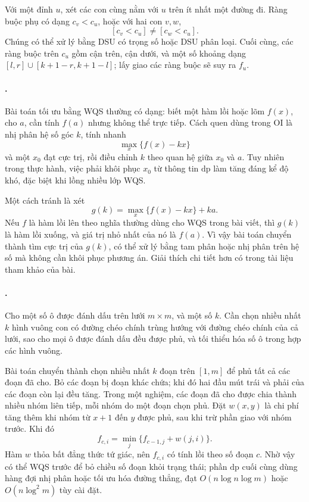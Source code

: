 \documentclass[11pt]{article}
\begin{document}
Với một đỉnh \(u\), xét các con cùng nằm với \(u\) trên ít nhất một đường đi.
Ràng buộc phụ có dạng \(c_v<c_u\), hoặc với hai con \(v,w\),
\[
  [c_v<c_u]\ne[c_w<c_u].
\]
Chúng có thể xử lý bằng DSU có trọng số hoặc DSU phân loại. Cuối cùng, các
ràng buộc trên \(c_u\) gồm cận trên, cận dưới, và một số khoảng dạng
\([l,r]\cup[k+1-r,k+1-l]\); lấy giao các ràng buộc sẽ suy ra \(f_u\).

\paragraph{.}

Bài toán tối ưu bằng WQS thường có dạng: biết một hàm lồi hoặc lõm
\(f(x)\), cho \(a\), cần tính \(f(a)\) nhưng không thể trực tiếp. Cách quen
dùng trong OI là nhị phân hệ số góc \(k\), tính nhanh
\[
  \max_x\{f(x)-kx\}
\]
và một \(x_0\) đạt cực trị, rồi điều chỉnh \(k\) theo quan hệ giữa \(x_0\) và
\(a\). Tuy nhiên trong thực hành, việc phải khôi phục \(x_0\) từ thông tin
\(\mathrm{dp}\) làm tăng đáng kể độ khó, đặc biệt khi lồng nhiều lớp WQS.

Một cách tránh là xét
\[
  g(k)=\max_x\{f(x)-kx\}+ka.
\]
Nếu \(f\) là hàm lồi lên theo nghĩa thường dùng cho WQS trong bài viết, thì
\(g(k)\) là hàm lồi xuống, và giá trị nhỏ nhất của nó là \(f(a)\). Vì vậy bài
toán chuyển thành tìm cực trị của \(g(k)\), có thể xử lý bằng tam phân hoặc
nhị phân trên hệ số mà không cần khôi phục phương án. Giải thích chi tiết hơn
có trong tài liệu tham khảo của bài.

\paragraph{.}
Cho một số ô được đánh dấu trên lưới \(m\times m\), và một số \(k\). Cần chọn
nhiều nhất \(k\) hình vuông con có đường chéo chính trùng hướng với đường chéo
chính của cả lưới, sao cho mọi ô được đánh dấu đều được phủ, và tối thiểu hóa
số ô trong hợp các hình vuông.

Bài toán chuyển thành chọn nhiều nhất \(k\) đoạn trên \([1,m]\) để phủ tất cả
các đoạn đã cho. Bỏ các đoạn bị đoạn khác chứa; khi đó hai đầu mút trái và phải
của các đoạn còn lại đều tăng. Trong một nghiệm, các đoạn đã cho được chia
thành nhiều nhóm liên tiếp, mỗi nhóm do một đoạn chọn phủ. Đặt \(w(x,y)\) là
chi phí tăng thêm khi nhóm từ \(x+1\) đến \(y\) được phủ, sau khi trừ phần giao
với nhóm trước. Khi đó
\[
  f_{c,i}=\min_j\{f_{c-1,j}+w(j,i)\}.
\]
Hàm \(w\) thỏa bất đẳng thức tứ giác, nên \(f_{c,i}\) có tính lồi theo số
đoạn \(c\). Nhờ vậy có thể WQS trước để bỏ chiều số đoạn khỏi trạng thái; phần
\(\mathrm{dp}\) cuối cùng dùng hàng đợi nhị phân hoặc tối ưu hóa đường thẳng,
đạt \(O(n\log n\log m)\) hoặc \(O(n\log^2 m)\) tùy cài đặt.
\end{document}
